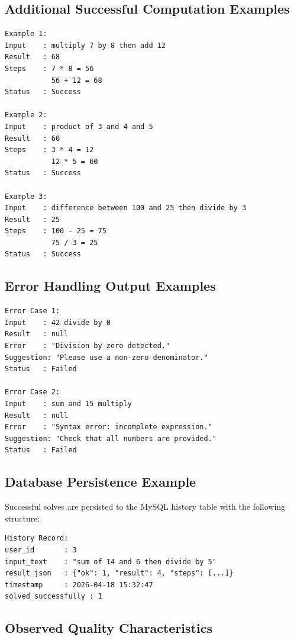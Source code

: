 \documentclass[12pt,a4paper]{report}
\begin{document}
\subsection{Additional Successful Computation Examples}

\begin{lstlisting}[style=phpcode,caption={Diverse arithmetic expression examples}]
Example 1:
Input    : multiply 7 by 8 then add 12
Result   : 68
Steps    : 7 * 8 = 56
           56 + 12 = 68
Status   : Success

Example 2:
Input    : product of 3 and 4 and 5
Result   : 60
Steps    : 3 * 4 = 12
           12 * 5 = 60
Status   : Success

Example 3:
Input    : difference between 100 and 25 then divide by 3
Result   : 25
Steps    : 100 - 25 = 75
           75 / 3 = 25
Status   : Success
\end{lstlisting}

\subsection{Error Handling Output Examples}

\begin{lstlisting}[style=phpcode,caption={Error cases with helpful messages}]
Error Case 1:
Input    : 42 divide by 0
Result   : null
Error    : "Division by zero detected."
Suggestion: "Please use a non-zero denominator."
Status   : Failed

Error Case 2:
Input    : sum and 15 multiply
Result   : null
Error    : "Syntax error: incomplete expression."
Suggestion: "Check that all numbers are provided."
Status   : Failed
\end{lstlisting}

\subsection{Database Persistence Example}

Successful solves are persisted to the MySQL history table with the following structure:

\begin{lstlisting}[style=phpcode,caption={Sample history record in database}]
History Record:
user_id       : 3
input_text    : "sum of 14 and 6 then divide by 5"
result_json   : {"ok": 1, "result": 4, "steps": [...]}
timestamp     : 2026-04-18 15:32:47
solved_successfully : 1
\end{lstlisting}

\subsection{Observed Quality Characteristics}
\end{document}

